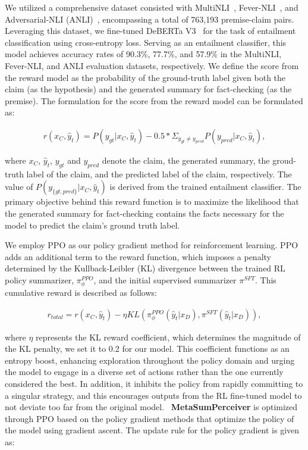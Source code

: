 We utilized a comprehensive dataset consisted with MultiNLI~\cite{N18-1101}, Fever-NLI~\cite{Thorne18Fever}, and Adversarial-NLI (ANLI)~\cite{nie-etal-2020-adversarial}, encompassing a total of 763,193 premise-claim pairs. Leveraging this dataset, we fine-tuned DeBERTa V3~\cite{he2023debertav3} for the task of entailment classification using cross-entropy loss. Serving as an entailment classifier, this model achieves accuracy rates of 90.3\%, 77.7\%, and 57.9\% in the MultiNLI, Fever-NLI, and ANLI evaluation datasets, respectively. We define the score from the reward model as the probability of the ground-truth label given both the claim (as the hypothesis) and the generated summary for fact-checking (as the premise). The formulation for the score from the reward model can be formulated as:

\begin{equation}
  \begin{array}{l}
    r(x_C, \hat{y}_t) = P(y_{gt}|{x_C, \hat{y}_t}) - 
    0.5 * \Sigma_{y_{gt} \neq y_{pred}} P(y_{pred}|{x_C, \hat{y}_t}),
  \end{array}
\end{equation}

where $x_C$, $\hat{y}_t$, $y_{gt}$ and $y_{pred}$ denote the claim, the generated summary, the groud-truth label of the claim, and the predicted label of the claim, respectively. The value of $P(y_{\{gt,pred\}}|x_C,\hat{y}_t)$ is derived from the trained entailment classifier. The primary objective behind this reward function is to maximize the likelihood that the generated summary for fact-checking contains the facts necessary for the model to predict the claim's ground truth label.

We employ PPO as our policy gradient method for reinforcement learning. PPO adds an additional term to the reward function, which imposes a penalty determined by the Kullback-Leibler (KL) divergence between the trained RL policy summarizer, $\pi^{PPO}_{\phi}$, and the initial supervised summarizer $\pi^{SFT}$. This cumulative reward is described as follows:

\begin{equation}
  \begin{array}{l}
    r_{total} = r(x_C, \hat{y}_t) - 
    \eta KL(\pi^{PPO}_{\phi}(\hat{y}_t|x_D), \pi^{SFT}(\hat{y}_t|x_D)),
  \end{array}
\end{equation}

where $\eta$ represents the KL reward coefficient, which determines the magnitude of the KL penalty, we set it to 0.2 for our model. This coefficient functions as an entropy boost, enhancing exploration throughout the policy domain and urging the model to engage in a diverse set of actions rather than the one currently considered the best. In addition, it inhibits the policy from rapidly committing to a singular strategy, and this encourages outputs from the RL fine-tuned model to not deviate too far from the original model. ~\textbf{MetaSumPerceiver} is optimized through PPO based on the policy gradient methods that optimize the policy of the model using gradient ascent. The update rule for the policy gradient is given as: 

